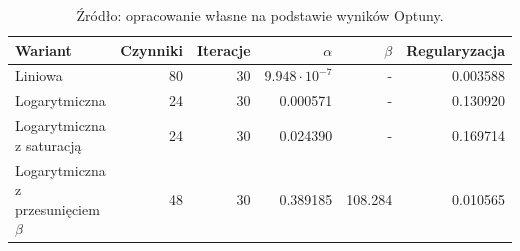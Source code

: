 \begin{table}[htbp]
\centering
\caption{Najlepsze hiperparametry wariantów ALS wybrane na zbiorze walidacyjnym}
\label{tab:hiperparametry-als}
\begin{tabular}{lrrrrr}
\toprule
Wariant & Czynniki & Iteracje & $\alpha$ & $\beta$ & Regularyzacja \\
\midrule
Liniowa & 80 & 30 & $9.948\cdot 10^{-7}$ & - & 0.003588 \\
Logarytmiczna & 24 & 30 & 0.000571 & - & 0.130920 \\
Logarytmiczna z saturacją & 24 & 30 & 0.024390 & - & 0.169714 \\
Logarytmiczna z przesunięciem $\beta$ & 48 & 30 & 0.389185 & 108.284 & 0.010565 \\
\bottomrule
\end{tabular}
\caption*{\footnotesize Źródło: opracowanie własne na podstawie wyników Optuny.}
\end{table}
